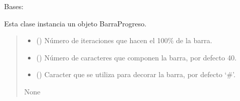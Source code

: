 \documentclass[letterpaper,10pt,english]{sphinxmanual}
\begin{document}
\begin{fulllineitems}
\label{\detokenize{utils:utils.BarraProgreso}}
\pysigstartsignatures
{}
\pysigstopsignatures
\sphinxAtStartPar
Bases: 

\sphinxAtStartPar
Esta clase instancia un objeto BarraProgreso.
\begin{quote}\begin{description}
\begin{itemize}
\item {} 
\sphinxAtStartPar
{} () \textendash{} Número de iteraciones que hacen el 100\% de la barra.

\item {} 
\sphinxAtStartPar
{} (\sphinxstyleliteralemphasis{\sphinxupquote{, }}) \textendash{} Número de caracteres que componen la barra, por defecto 40.

\item {} 
\sphinxAtStartPar
{} (\sphinxstyleliteralemphasis{\sphinxupquote{, }}) \textendash{} Caracter que se utiliza para decorar la barra, por defecto ‘\#’.

\end{itemize}

\sphinxAtStartPar
None

\end{description}\end{quote}

\end{fulllineitems}

\end{document}

